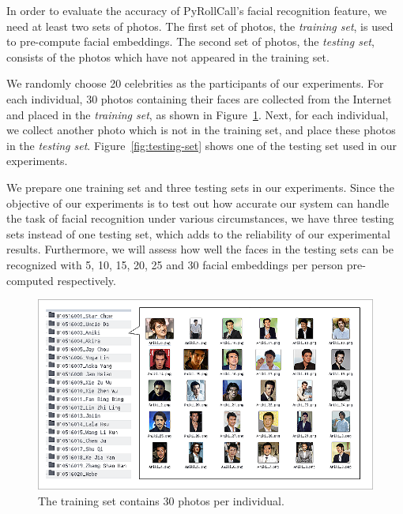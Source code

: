 In order to evaluate the accuracy of PyRollCall's facial recognition feature, we need at least two sets of photos.
The first set of photos, the \emph{training set}, is used to pre-compute facial embeddings.
The second set of photos, the \emph{testing set}, consists of the photos which have not appeared in the training set.
\vspace{0.5cm}

We randomly choose 20 celebrities as the participants of our experiments. For each individual, 30 photos
containing their faces are collected from the Internet and placed in the \emph{training set}, as shown in Figure~\ref{fig:training-set}.
Next, for each individual, we collect another photo which is not in the training set, and place these photos in the \emph{testing set}.
Figure~\ref{fig:testing-set} shows one of the testing set used in our experiments.
\vspace{0.5cm}

We prepare one training set and three testing sets in our experiments. Since the objective of
our experiments is to test out how accurate our system can handle the task of facial recognition
under various circumstances, we have three testing sets instead of one testing set, which
adds to the reliability of our experimental results. Furthermore, we will assess
how well the faces in the testing sets can be recognized with 5, 10, 15, 20, 25 and 30
facial embeddings per person pre-computed respectively.
\vspace{0.2cm}

\begin{figure}[!htb]
  \centering
  \includegraphics[width=\linewidth]{figures/training-set.png}
  \caption{The training set contains 30 photos per individual.}
  \label{fig:training-set}
\end{figure}
\vspace{0.5cm}

